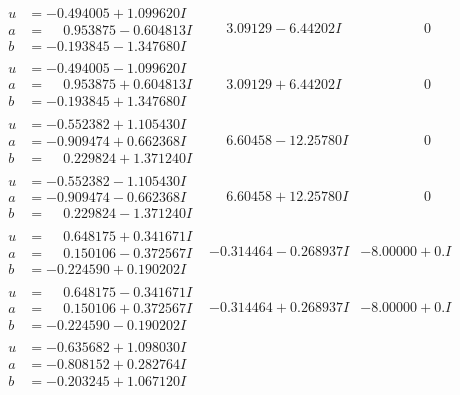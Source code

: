\documentclass[1p]{elsarticle_modified}
\theoremstyle{definition}
\begin{document}
$$\begin{array}{c|c|c}
\begin{aligned}
u &= -0.494005 + 1.099620 I \\
a &= \phantom{-}0.953875 - 0.604813 I \\
b &= -0.193845 - 1.347680 I\end{aligned}
 & \phantom{-}3.09129 - 6.44202 I & \phantom{-0.000000 } 0 \\ \hline\begin{aligned}
u &= -0.494005 - 1.099620 I \\
a &= \phantom{-}0.953875 + 0.604813 I \\
b &= -0.193845 + 1.347680 I\end{aligned}
 & \phantom{-}3.09129 + 6.44202 I & \phantom{-0.000000 } 0 \\ \hline\begin{aligned}
u &= -0.552382 + 1.105430 I \\
a &= -0.909474 + 0.662368 I \\
b &= \phantom{-}0.229824 + 1.371240 I\end{aligned}
 & \phantom{-}6.60458 - 12.25780 I & \phantom{-0.000000 } 0 \\ \hline\begin{aligned}
u &= -0.552382 - 1.105430 I \\
a &= -0.909474 - 0.662368 I \\
b &= \phantom{-}0.229824 - 1.371240 I\end{aligned}
 & \phantom{-}6.60458 + 12.25780 I & \phantom{-0.000000 } 0 \\ \hline\begin{aligned}
u &= \phantom{-}0.648175 + 0.341671 I \\
a &= \phantom{-}0.150106 - 0.372567 I \\
b &= -0.224590 + 0.190202 I\end{aligned}
 & -0.314464 - 0.268937 I & -8.00000 + 0. I\phantom{ +0.000000I} \\ \hline\begin{aligned}
u &= \phantom{-}0.648175 - 0.341671 I \\
a &= \phantom{-}0.150106 + 0.372567 I \\
b &= -0.224590 - 0.190202 I\end{aligned}
 & -0.314464 + 0.268937 I & -8.00000 + 0. I\phantom{ +0.000000I} \\ \hline\begin{aligned}
u &= -0.635682 + 1.098030 I \\
a &= -0.808152 + 0.282764 I \\
b &= -0.203245 + 1.067120 I\end{aligned}

\end{array}$$
\end{document}
